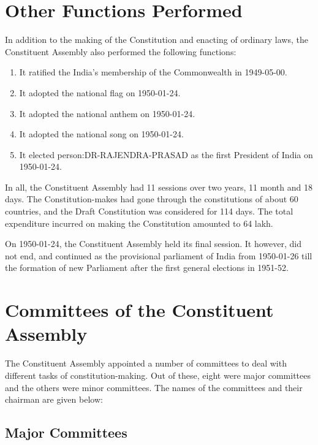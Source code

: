 \section{Other Functions Performed}

In addition to the making of the Constitution and enacting of ordinary laws, the Constituent Assembly also performed the following functions:

\begin{enumerate}
  \item It ratified the India's membership of the Commonwealth in 1949-05-00.
  \item It adopted the national flag on 1950-01-24.
  \item It adopted the national anthem on 1950-01-24.
  \item It adopted the national song on 1950-01-24.
  \item It elected \gls{person:DR-RAJENDRA-PRASAD} as the first President of India on 1950-01-24.
\end{enumerate}

In all, the Constituent Assembly had 11 sessions over two years, 11 month and 18 days. The Constitution-makes had gone through the constitutions of about 60 countries, and the Draft Constitution was considered for 114 days. The total expenditure incurred on making the Constitution amounted to 64 lakh.

On 1950-01-24, the Constituent Assembly held its final session. It however, did not end, and continued as the provisional parliament of India from 1950-01-26 till the formation of new Parliament after the first general elections in 1951-52.

\section{Committees of the Constituent Assembly}

The Constituent Assembly appointed a number of committees to deal with different tasks of constitution-making. Out of these, eight were major committees and the others were minor committees. The names of the committees and their chairman are given below:

\subsection{Major Committees}

